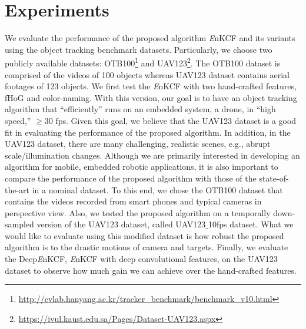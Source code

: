 \documentclass[10pt,twocolumn,letterpaper]{article}
\begin{document}
\section{Experiments} \label{sc:Experiments}
We evaluate the performance of the proposed algorithm {\it E}nKCF and
its variants using the object tracking benchmark
datasets. Particularly, we choose two publicly available datasets:
OTB100\footnote{\url{http://cvlab.hanyang.ac.kr/tracker_benchmark/benchmark_v10.html}}
and
UAV123\footnote{\url{https://ivul.kaust.edu.sa/Pages/Dataset-UAV123.aspx}}\cite{mueller2016uav123}.
The OTB100 dataset is comprised of the videos of 100 objects whereas
UAV123 dataset contains aerial footages of 123 objects.  We first test
the {\it E}nKCF with two hand-crafted features, fHoG and color-naming.
With this version, our goal is to have an object tracking algorithm
that ``efficiently'' runs on an embedded system, a drone, in ``high
speed,'' $\ge 30$ fps. Given this goal, we believe that the UAV123
dataset is a good fit in evaluating the performance of the proposed
algorithm. In addition, in the UAV123 dataset, there are many
challenging, realistic scenes, e.g., abrupt scale/illumination
changes. Although we are primarily interested in developing an
algorithm for mobile, embedded robotic applications, it is also
important to compare the performance of the proposed algorithm with
those of the state-of-the-art in a nominal dataset. To this end, we
chose the OTB100 dataset that contains the videos recorded from smart
phones and typical cameras in perspective view. Also, we tested the
proposed algorithm on a temporally down-sampled version of the UAV123
dataset, called UAV123$\_$10fps dataset. What we would like to
evaluate using this modified dataset is how robust the proposed
algorithm is to the drastic motions of camera and targets. Finally, we
evaluate the Deep{\it E}nKCF, {\it E}nKCF with deep convolutional
features, on the UAV123 dataset to observe how much gain we can
achieve over the hand-crafted features.
\end{document}
